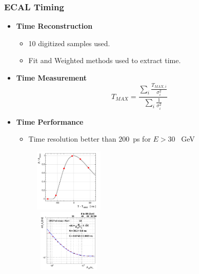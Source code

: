 \documentclass{beamer}
\begin{document}
\begin{frame}
\frametitle{\huge{ECAL Timing}}
 \begin{minipage}[b]{0.8\paperwidth}
  \begin{itemize}
   \item\textcolor{UMN@Maroon}{\textbf{Time Reconstruction}} 
      \begin{itemize}
        \item 10 digitized samples used.
        \item Fit and Weighted methods used to extract time.
      \end{itemize}   
   \item \textcolor{UMN@Maroon}{\textbf{Time Measurement}}
 $$  T_{MAX} = \frac{{\displaystyle\sum_{i}} \frac{T_{MAX,i} }{\sigma_i^2} }{ {\displaystyle\sum_{i}} \frac{1}{\sigma_i^2} } $$
  \end{itemize}   
\end{minipage}
 
 \begin{minipage}[b]{0.8\paperwidth}
   \begin{itemize}
    \item \textcolor{UMN@Maroon}{\textbf{Time Performance}}
    \begin{itemize}
     \item  Time resolution better than $200$~ps for $E > 30$ ~GeV
    \end{itemize}
     
   \end{itemize}
 \end{minipage}
 \mbox{\includegraphics[height=3.0cm,width=0.50\textwidth]            {THESISPLOTS/AmplitudeVsTMax.png}
      \includegraphics[height=3.0cm,width=0.50\textwidth]            {THESISPLOTS/NeigboMethodECALTimeRes.png}}
\end{frame}
\end{document}
